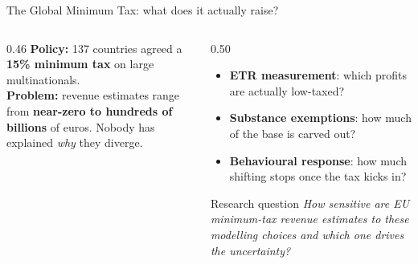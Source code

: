 \documentclass[aspectratio=169, 11pt]{beamer}
\newcommand{\highlight}[1]{\textcolor{DkOrange}{\textbf{#1}}}
\newcommand{\emphbx}[1]{\textcolor{Bordeaux}{\textbf{#1}}}
\begin{document}
\begin{frame}{The Global Minimum Tax: what does it actually raise?}

\begin{columns}[T]
\begin{column}{0.46\textwidth}
  \textbf{Policy:} 137 countries agreed a \highlight{15\% minimum tax} on large multinationals.\\[10pt]

  \textbf{Problem:} revenue estimates range from \emphbx{near-zero to hundreds of billions} of euros. Nobody has explained \emph{why} they diverge.\\[10pt]

\end{column}
\begin{column}{0.50\textwidth}
  \vspace{0.2em}
  \begin{itemize}
    \item[\textcolor{DkOrange}{\textbf{1.}}] \textbf{ETR measurement}: which profits are actually low-taxed?
    \item[\textcolor{DkOrange}{\textbf{2.}}] \textbf{Substance exemptions}: how much of the base is carved out?
    \item[\textcolor{DkOrange}{\textbf{3.}}] \textbf{Behavioural response}: how much shifting stops once the tax kicks in?
  \end{itemize}

  \vspace{10pt}
  \begin{alertblock}{Research question}
    \itshape How sensitive are EU minimum-tax revenue estimates to these modelling choices and which one drives the uncertainty?
  \end{alertblock}

\end{column}
\end{columns}

\end{frame}
\end{document}
